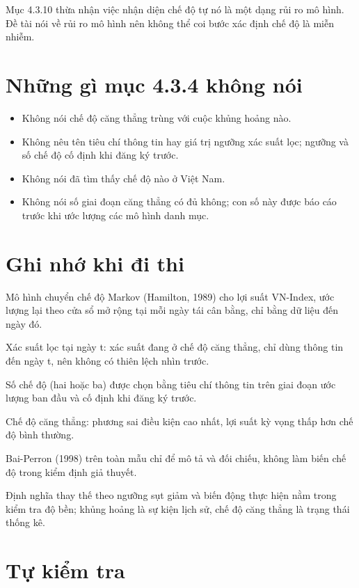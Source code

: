 Mục 4.3.10 thừa nhận việc nhận diện chế độ tự nó là một dạng rủi ro mô hình. Đề tài nói về rủi ro mô hình nên không thể coi bước xác định chế độ là miễn nhiễm.

\section{Những gì mục 4.3.4 không nói}

\begin{itemize}
\item
  Không nói chế độ căng thẳng trùng với cuộc khủng hoảng nào.
\item
  Không nêu tên tiêu chí thông tin hay giá trị ngưỡng xác suất lọc; ngưỡng và số chế độ cố định khi đăng ký trước.
\item
  Không nói đã tìm thấy chế độ nào ở Việt Nam.
\item
  Không nói số giai đoạn căng thẳng có đủ không; con số này được báo cáo trước khi ước lượng các mô hình danh mục.
\end{itemize}

\section{Ghi nhớ khi đi thi}

\begin{tcolorbox}[breakable]
Mô hình chuyển chế độ Markov (Hamilton, 1989) cho lợi suất VN-Index, ước lượng lại theo cửa sổ mở rộng tại mỗi ngày tái cân bằng, chỉ bằng dữ liệu đến ngày đó.

Xác suất lọc tại ngày t: xác suất đang ở chế độ căng thẳng, chỉ dùng thông tin đến ngày t, nên không có thiên lệch nhìn trước.

Số chế độ (hai hoặc ba) được chọn bằng tiêu chí thông tin trên giai đoạn ước lượng ban đầu và cố định khi đăng ký trước.

Chế độ căng thẳng: phương sai điều kiện cao nhất, lợi suất kỳ vọng thấp hơn chế độ bình thường.

Bai-Perron (1998) trên toàn mẫu chỉ để mô tả và đối chiếu, không làm biến chế độ trong kiểm định giả thuyết.

Định nghĩa thay thế theo ngưỡng sụt giảm và biến động thực hiện nằm trong kiểm tra độ bền; khủng hoảng là sự kiện lịch sử, chế độ căng thẳng là trạng thái thống kê.
\end{tcolorbox}

\section{Tự kiểm tra}


